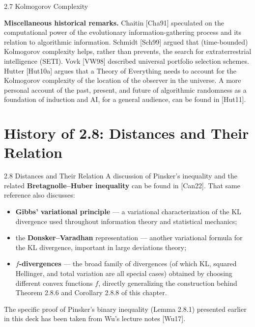 \documentclass[aspectratio=169,10pt]{beamer}
\begin{document}
\begin{frame}[allowframebreaks]{2.7 Kolmogorov Complexity}
  \framebreak

  \textbf{Miscellaneous historical remarks.} Chaitin [Cha91] speculated on
  the computational power of the evolutionary information-gathering
  process and its relation to algorithmic information. Schmidt [Sch99]
  argued that (time-bounded) Kolmogorov complexity helps, rather than
  prevents, the search for extraterrestrial intelligence (SETI). Vovk
  [VW98] described universal portfolio selection schemes. Hutter [Hut10a]
  argues that a Theory of Everything needs to account for the Kolmogorov
  complexity of the location of the observer in the universe. A more
  personal account of the past, present, and future of algorithmic
  randomness as a foundation of induction and AI, for a general audience,
  can be found in [Hut11].
\end{frame}

\section{History of 2.8: Distances and Their Relation}

\begin{frame}{2.8 Distances and Their Relation}
  A discussion of Pinsker's inequality and the related
  \textbf{Bretagnolle--Huber inequality} can be found in [Can22]. That same
  reference also discusses:
  \begin{itemize}
    \item \textbf{Gibbs' variational principle} --- a variational
      characterization of the KL divergence used throughout information
      theory and statistical mechanics;
    \item the \textbf{Donsker--Varadhan} representation --- another
      variational formula for the KL divergence, important in large
      deviations theory;
    \item \textbf{$f$-divergences} --- the broad family of divergences
      (of which KL, squared Hellinger, and total variation are all special
      cases) obtained by choosing different convex functions $f$, directly
      generalizing the construction behind Theorem 2.8.6 and
      Corollary 2.8.8 of this chapter.
  \end{itemize}

  The specific proof of Pinsker's binary inequality (Lemma 2.8.1) presented
  earlier in this deck has been taken from Wu's lecture notes [Wu17].
\end{frame}
\end{document}
